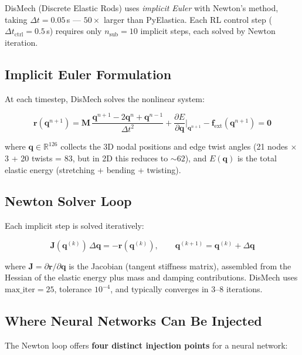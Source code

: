 \documentclass[11pt]{article}
\newcommand{\vect}[1]{\mathbf{#1}}
\newcommand{\mat}[1]{\mathbf{#1}}
\newcommand{\Real}{\mathbb{R}}
\begin{document}
DisMech (Discrete Elastic Rods) uses \emph{implicit Euler} with Newton's method, taking $\Delta t = 0.05$\,s --- $50\times$ larger than PyElastica.
Each RL control step ($\Delta t_{\text{ctrl}} = 0.5$\,s) requires only $n_{\text{sub}} = 10$ implicit steps, each solved by Newton iteration.

\subsection{Implicit Euler Formulation}

At each timestep, DisMech solves the nonlinear system:

\begin{equation}
  \boxed{\;
  \vect{r}(\vect{q}^{n+1}) = \mat{M}\,\frac{\vect{q}^{n+1} - 2\vect{q}^n + \vect{q}^{n-1}}{\Delta t^2} + \frac{\partial E}{\partial \vect{q}}\bigg|_{\vect{q}^{n+1}} - \vect{f}_{\text{ext}}(\vect{q}^{n+1}) = \vect{0}
  \;}
  \label{eq:implicit-euler}
\end{equation}

\noindent
where $\vect{q} \in \Real^{126}$ collects the 3D nodal positions and edge twist angles (21 nodes $\times$ 3 + 20 twists = 83, but in 2D this reduces to ${\sim}62$), and $E(\vect{q})$ is the total elastic energy (stretching + bending + twisting).

\subsection{Newton Solver Loop}

Each implicit step is solved iteratively:

\begin{equation}
  \mat{J}(\vect{q}^{(k)})\,\Delta\vect{q} = -\vect{r}(\vect{q}^{(k)}), \qquad
  \vect{q}^{(k+1)} = \vect{q}^{(k)} + \Delta\vect{q}
  \label{eq:newton}
\end{equation}

\noindent
where $\mat{J} = \partial\vect{r}/\partial\vect{q}$ is the Jacobian (tangent stiffness matrix), assembled from the Hessian of the elastic energy plus mass and damping contributions.
DisMech uses $\text{max\_iter} = 25$, tolerance $10^{-4}$, and typically converges in 3--8 iterations.

\subsection{Where Neural Networks Can Be Injected}

The Newton loop offers \textbf{four distinct injection points} for a neural network:
\end{document}
